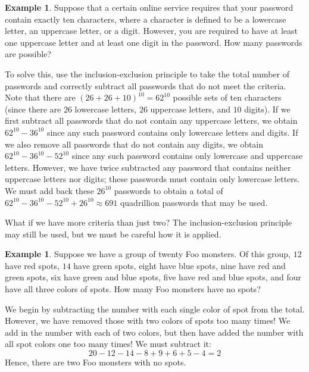 \documentclass{book}
\theoremstyle{plain}
\theoremstyle{definition}
\newtheorem{example}[theorem]{Example}
\begin{document}
\begin{example}
Suppose that a certain online service requires that your password contain exactly ten characters, where a character is defined to be a lowercase letter, an uppercase letter, or a digit. However, you are required to have at least one uppercase letter and at least one digit in the password. How many passwords are possible?

To solve this, use the inclusion-exclusion principle to take the total number of passwords and correctly subtract all passwords that do not meet the criteria. Note that there are $(26+26+10)^{10} = 62^{10}$ possible sets of ten characters (since there are $26$ lowercase letters, $26$ uppercase letters, and $10$ digits). If we first subtract all passwords that do not contain any uppercase letters, we obtain $62^{10} - 36^{10}$ since any such password contains only lowercase letters and digits. If we also remove all passwords that do not contain any digits, we obtain $62^{10} - 36^{10} - 52^{10}$ since any such password contains only lowercase and uppercase letters. However, we have twice subtracted any password that contains neither uppercase letters nor digits; these passwords must contain only lowercase letters. We must add back these $26^{10}$ passwords to obtain a total of $62^{10} - 36^{10} - 52^{10} + 26^{10} \approx 691$ quadrillion passwords that may be used.
\end{example}

What if we have more criteria than just two? The inclusion-exclusion principle may still be used, but we must be careful how it is applied.

\begin{example}
Suppose we have a group of twenty Foo monsters. Of this group, $12$ have red spots, $14$ have green spots, eight have blue spots, nine have red and green spots, six have green and blue spots, five have red and blue spots, and four have all three colors of spots. How many Foo monsters have no spots?

We begin by subtracting the number with each single color of spot from the total. However, we have removed those with two colors of spots too many times! We add in the number with each of two colors, but then have added the number with all spot colors one too many times! We must subtract it: $$20 - 12 - 14 - 8 + 9 + 6 + 5 - 4 = 2$$ Hence, there are two Foo monsters with no spots.
\end{example}
\end{document}
